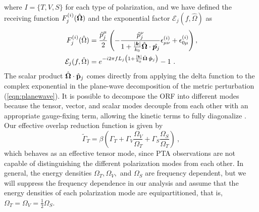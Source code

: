 \documentclass[prd,twocolumn,aps,psfig,nofootinbib,nobibnotes,superscriptaddress,preprintnumbers,times]{revtex4-2}
\begin{document}
where $I = \{T,V,S\}$ for each type of polarization, and we have defined the receiving function $F^{(i)}_j(\hat{\bf \Omega})$ and the exponential factor $\mathcal{E}_j(f, \hat{\Omega})$ as 
\begin{equation}\label{eqn:recieving}
    \begin{aligned}
        F^{(i)}_j(\hat{\Omega}) &= \frac{\hat{p}^\mu_j}{2}\left(-\frac{\hat{p}^\nu_j}{1+\frac{|\boldsymbol{k}|}{k_0} \hat{\boldsymbol{\Omega}} \cdot \hat{\boldsymbol{p}_j}} \epsilon_{\mu \nu}^{(i)}+\epsilon_{0 \mu}^{(i)}\right) , \\ 
        \mathcal{E}_j(f, \hat{\Omega}) &= e^{-i2\pi f L_j\left( 1 + \frac{|{\bf k}|}{k_0} \hat{\bf \Omega}\cdot \hat{\bf p}_j\right)} - 1 \ . 
    \end{aligned}
\end{equation}
The scalar product $\hat{\bf \Omega}\cdot \hat{\bf p}_j$ comes directly from applying the delta function to the complex exponential in the plane-wave decomposition of the metric perturbation (\ref{eqn:planewave}). 
It is possible to decompose the ORF into different modes because the tensor, vector, and scalar modes decouple from each other with an appropriate gauge-fixing term, allowing the kinetic terms to fully diagonalize \cite{Hinterbichler:2011tt}. Our effective overlap reduction function is given by 
\begin{equation}\label{eq:eff_orf}
    \tilde{\Gamma}_{T} = \beta \left(\Gamma_{T} + \Gamma_{V} \frac{\Omega_V}{\Omega_T} + \Gamma_{S} \frac{\Omega_S}{\Omega_T} \right) \ ,
\end{equation}
which behaves as an effective tensor mode, since PTA observations are not capable of distinguishing the different polarization modes from each other. In general, the energy densities $\Omega_T, \Omega_V,$ and $\Omega_S$ are frequency dependent, but we will suppress the frequency dependence in our analysis and assume that the energy densities of each polarization mode are equipartitioned, that is, $\Omega_T = \Omega_V = \frac{1}{2}\Omega_S$. 
\end{document}
